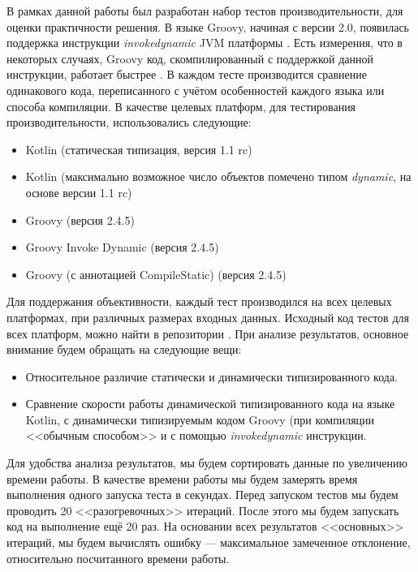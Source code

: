 В рамках данной работы был разработан набор тестов производительности, для оценки практичности решения. В языке Groovy, начиная с версии 2.0, появилась поддержка инструкции \textit{invokedynamic} JVM платформы \cite{groovy:invokeDynamicSupport}. Есть измерения, что в некоторых случаях, Groovy код, скомпилированный с поддержкой данной инструкции, работает быстрее \cite{groovy:indyTest1}.
В каждом тесте производится сравнение одинакового кода, переписанного с учётом особенностей каждого языка или способа компиляции. В качестве целевых платформ, для тестирования производительности, использовались следующие:

\begin{itemize}
    \item Kotlin (статическая типизация, версия 1.1 rc) 
    \item Kotlin (максимально возможное число объектов помечено типом \textit{dynamic}, на основе версии 1.1 rc)
    \item Groovy (версия 2.4.5)
    \item Groovy Invoke Dynamic (версия 2.4.5)
    \item Groovy (с аннотацией \at CompileStatic) (версия 2.4.5)
\end{itemize}


Для поддержания объективности, каждый тест производился на всех целевых платформах, при различных размерах входных данных. Исходный код тестов для всех платформ, можно найти в репозитории \cite{github:myBenchs}. При анализе результатов, основное внимание будем обращать на следующие вещи:

\begin{itemize}
    \item Относительное различие статически и динамически типизированного кода.
    \item Сравнение скорости работы динамической типизированного кода на языке Kotlin, с динамически типизируемым кодом Groovy (при компиляции <<обычным способом>> и с помощью \textit{invokedynamic} инструкции.
\end{itemize}

Для удобства анализа результатов, мы будем сортировать данные по увеличению времени работы. В качестве времени работы мы будем замерять время выполнения одного запуска теста в секундах. Перед запуском тестов мы будем проводить 20 <<разогревочных>> итераций. После этого мы будем запускать код на выполнение ещё 20 раз. На основании всех результатов <<основных>> итераций, мы будем вычислять ошибку --- максимальное замеченное отклонение, относительно посчитанного времени работы.


